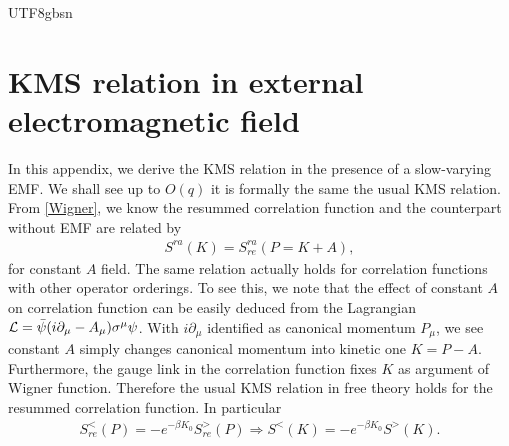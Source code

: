 \documentclass[11pt]{article}\def\baselinestretch{1.4}
\def\b{{\beta}}
\def\m{{\mu}}
\def\s{{\sigma}}
\newcommand{\pd}{{\partial}}
\begin{document}
\begin{CJK}{UTF8}{gbsn}
%


\section{KMS relation in external electromagnetic field}\label{sec_app_B}

In this appendix, we derive the KMS relation in the presence of a slow-varying EMF. We shall see up to $O(q)$ it is formally the same the usual KMS relation. From \eqref{Wigner}, we know the resummed correlation function and the counterpart without EMF are related by
\begin{align}
S^{ra}(K)=S_{re}^{ra}(P=K+A),
\end{align}
for constant $A$ field. The same relation actually holds for correlation functions with other operator orderings. To see this, we note that the effect of constant $A$ on correlation function can be easily deduced from the Lagrangian ${\cal L}=\bar{\psi}(i\pd_\m-A_\m)\s^\m\psi$. With $i\pd_\m$ identified as canonical momentum $P_\m$, we see constant $A$ simply changes canonical momentum into kinetic one $K=P-A$. Furthermore, the gauge link in the correlation function fixes $K$ as argument of Wigner function. Therefore the usual KMS relation in free theory holds for the resummed correlation function. In particular
\begin{align}
S_{re}^<(P)=-e^{-\b K_0}S_{re}^>(P)\Rightarrow S^<(K)=-e^{-\b K_0}S^>(K).
\end{align}


\end{CJK}
\end{document}
